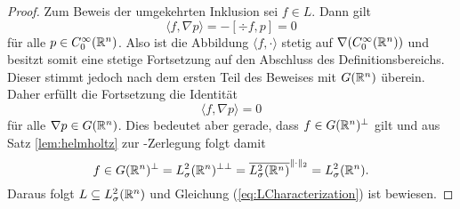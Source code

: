 \begin{proof}
  Zum Beweis der umgekehrten Inklusion sei $f \in L$.
  Dann gilt
  $$
  \langle f, \nabla p \rangle = -[\div f, p] = 0
  $$
  für alle $p \in C_0^\infty(\mathbb{R}^n)$.
  Also ist die Abbildung $\langle f, \cdot\rangle$ stetig auf $\nabla (C_0^\infty(\mathbb{R}^n))$ und besitzt somit eine stetige Fortsetzung auf den Abschluss des Definitionsbereichs. 
  Dieser stimmt jedoch nach dem ersten Teil des Beweises mit $G(\mathbb{R}^n)$ überein.
  Daher erfüllt die Fortsetzung die Identität
  $$
  \langle f, \nabla p \rangle = 0 
  $$
  für alle $\nabla p \in G(\mathbb{R}^n)$.
  Dies bedeutet aber gerade, dass $f \in G(\mathbb{R}^n)^\perp$ gilt und aus Satz \ref{lem:helmholtz} zur \helmholtz\hyp{}Zerlegung folgt damit
  $$
  f \in G(\mathbb{R}^n)^\perp 
  = L_\sigma^2(\mathbb{R}^n)^{\perp\perp} 
  = \overline{L_\sigma^2(\mathbb{R}^n)}^{\lVert \cdot \rVert_2}
  = L_\sigma^2(\mathbb{R}^n).
  $$
  Daraus folgt $L \subseteq L_\sigma^2(\mathbb{R}^n)$ und Gleichung (\ref{eq:LCharacterization}) ist bewiesen.
\end{proof}
